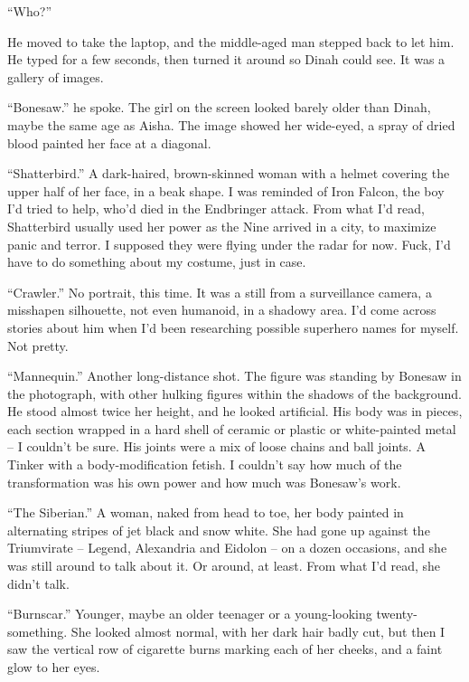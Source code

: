 ``Who?''



He moved to take the laptop, and the middle-aged man stepped back to let him.  He typed for a few seconds, then turned it around so Dinah could see.  It was a gallery of images.



``Bonesaw.'' he spoke.  The girl on the screen looked barely older than Dinah, maybe the same age as Aisha.  The image showed her wide-eyed, a spray of dried blood painted her face at a diagonal.



``Shatterbird.''  A dark-haired, brown-skinned woman with a helmet covering the upper half of her face, in a beak shape.  I was reminded of Iron Falcon, the boy I'd tried to help, who'd died in the Endbringer attack.  From what I'd read, Shatterbird usually used her power as the Nine arrived in a city, to maximize panic and terror.  I supposed they were flying under the radar for now.  Fuck, I'd have to do something about my costume, just in case.



``Crawler.''  No portrait, this time.  It was a still from a surveillance camera, a misshapen silhouette, not even humanoid, in a shadowy area.  I'd come across stories about him when I'd been researching possible superhero names for myself.  Not pretty.



``Mannequin.''  Another long-distance shot.  The figure was standing by Bonesaw in the photograph, with other hulking figures within the shadows of the background.  He stood almost twice her height, and he looked artificial.  His body was in pieces, each section wrapped in a hard shell of ceramic or plastic or white-painted metal – I couldn't be sure.  His joints were a mix of loose chains and ball joints.  A Tinker with a body-modification fetish.  I couldn't say how much of the transformation was his own power and how much was Bonesaw's work.



``The Siberian.''  A woman, naked from head to toe, her body painted in alternating stripes of jet black and snow white.  She had gone up against the Triumvirate – Legend, Alexandria and Eidolon – on a dozen occasions, and she was still around to talk about it.  Or around, at least.  From what I'd read, she didn't talk.



``Burnscar.'' Younger, maybe an older teenager or a young-looking twenty-something.  She looked almost normal, with her dark hair badly cut, but then I saw the vertical row of cigarette burns marking each of her cheeks, and a faint glow to her eyes.



